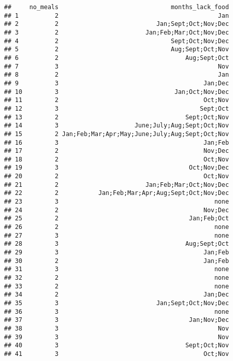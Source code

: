 \documentclass[
]{article}
\begin{document}
\begin{verbatim}
##     no_meals                               months_lack_food
## 1          2                                            Jan
## 2          2                           Jan;Sept;Oct;Nov;Dec
## 3          2                        Jan;Feb;Mar;Oct;Nov;Dec
## 4          2                               Sept;Oct;Nov;Dec
## 5          2                               Aug;Sept;Oct;Nov
## 6          2                                   Aug;Sept;Oct
## 7          3                                            Nov
## 8          2                                            Jan
## 9          3                                        Jan;Dec
## 10         3                                Jan;Oct;Nov;Dec
## 11         2                                        Oct;Nov
## 12         3                                       Sept;Oct
## 13         2                                   Sept;Oct;Nov
## 14         3                     June;July;Aug;Sept;Oct;Nov
## 15         2 Jan;Feb;Mar;Apr;May;June;July;Aug;Sept;Oct;Nov
## 16         3                                        Jan;Feb
## 17         2                                        Nov;Dec
## 18         2                                        Oct;Nov
## 19         3                                    Oct;Nov;Dec
## 20         2                                        Oct;Nov
## 21         2                        Jan;Feb;Mar;Oct;Nov;Dec
## 22         2           Jan;Feb;Mar;Apr;Aug;Sept;Oct;Nov;Dec
## 23         3                                           none
## 24         2                                        Nov;Dec
## 25         2                                    Jan;Feb;Oct
## 26         2                                           none
## 27         3                                           none
## 28         3                                   Aug;Sept;Oct
## 29         3                                        Jan;Feb
## 30         2                                        Jan;Feb
## 31         3                                           none
## 32         2                                           none
## 33         2                                           none
## 34         2                                        Jan;Dec
## 35         3                           Jan;Sept;Oct;Nov;Dec
## 36         3                                           none
## 37         3                                    Jan;Nov;Dec
## 38         3                                            Nov
## 39         3                                            Nov
## 40         3                                   Sept;Oct;Nov
## 41         3                                        Oct;Nov

\end{verbatim}
\end{document}
